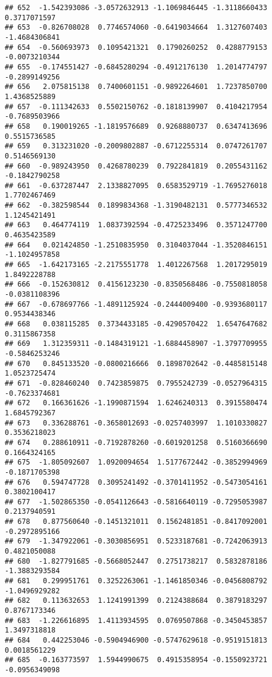 \documentclass[
]{article}
\begin{document}
\begin{verbatim}
## 652  -1.542393086 -3.0572632913 -1.1069846445 -1.3118660433  0.3717071597
## 653  -0.826708028  0.7746574060 -0.6419034664  1.3127607403 -1.4684306841
## 654  -0.560693973  0.1095421321  0.1790260252  0.4288779153 -0.0073210344
## 655  -0.174551427 -0.6845280294 -0.4912176130  1.2014774797 -0.2899149256
## 656   2.075815138  0.7400601151 -0.9892264601  1.7237850700  1.4368525889
## 657  -0.111342633  0.5502150762 -0.1818139907  0.4104217954 -0.7689503966
## 658   0.190019265 -1.1819576689  0.9268880737  0.6347413696  0.5515736585
## 659   0.313231020 -0.2009802887 -0.6712255314  0.0747261707  0.5146569130
## 660  -0.989243950  0.4268780239  0.7922841819  0.2055431162 -0.1842790258
## 661  -0.637287447  2.1338827095  0.6583529719 -1.7695276018  1.7702467469
## 662  -0.382598544  0.1899834368 -1.3190482131  0.5777346532  1.1245421491
## 663   0.464774119  1.0837392594 -0.4725233496  0.3571247700  0.4635423589
## 664   0.021424850 -1.2510835950  0.3104037044 -1.3520846151 -1.1024957858
## 665  -1.642173165 -2.2175551778  1.4012267568  1.2017295019  1.8492228788
## 666  -0.152630812  0.4156123230 -0.8350568486 -0.7550818058 -0.0381108396
## 667  -0.678697766 -1.4891125924 -0.2444009400 -0.9393680117  0.9534438346
## 668   0.038115285  0.3734433185 -0.4290570422  1.6547647682  0.3115867358
## 669   1.312359311 -0.1484319121 -1.6884458907 -1.3797709955 -0.5846253246
## 670   0.845133520 -0.0800216666  0.1898702642 -0.4485815148  1.0523725474
## 671  -0.828460240  0.7423859875  0.7955242739 -0.0527964315 -0.7623374681
## 672   0.166361626 -1.1990871594  1.6246240313  0.3915580474  1.6845792367
## 673   0.336288761 -0.3658012693 -0.0257403997  1.1010330827  0.3536218023
## 674   0.288610911 -0.7192878260 -0.6019201258  0.5160366690  0.1664324165
## 675  -1.805092607  1.0920094654  1.5177672442 -0.3852994969 -0.1871705398
## 676   0.594747728  0.3095241492 -0.3701411952 -0.5473054161  0.3802100417
## 677  -1.502865350 -0.0541126643 -0.5816640119 -0.7295053987  0.2137940591
## 678   0.877560640 -0.1451321011  0.1562481851 -0.8417092001 -0.2972895166
## 679  -1.347922061 -0.3030856951  0.5233187681 -0.7242063913  0.4821050088
## 680  -1.827791685 -0.5668052447  0.2751738217  0.5832878186 -1.3883293584
## 681   0.299951761  0.3252263061 -1.1461850346 -0.0456808792 -1.0496929282
## 682   0.113632653  1.1241991399  0.2124388684  0.3879183297  0.8767173346
## 683  -1.226616895  1.4113934595  0.0769507868 -0.3450453857  1.3497318818
## 684   0.442253046 -0.5904946900 -0.5747629618 -0.9519151813  0.0018561229
## 685  -0.163773597  1.5944990675  0.4915358954 -0.1550923721 -0.0956349098

\end{verbatim}
\end{document}
